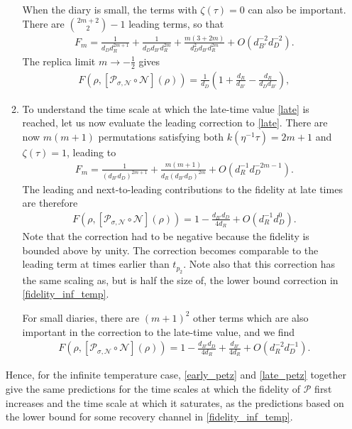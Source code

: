 \documentclass[a4paper,11pt]{article}
\newcommand\half{{\ensuremath{\frac{1}{2}}}}
\newcommand\ha{{\half}}
\newcommand\sP{{\ensuremath{{\mathcal P}}}}
\begin{document}
\begin{enumerate}
\begin{enumerate}
When the diary is small, the terms with $\zeta(\tau) = 0$ can also be important. There are $\binom{2m+2}{2}-1$ leading terms, so that 
\begin{align}
 F_m = \frac{1}{d_{D}d_R^{2m +1}} + \frac{1}{d_{D}d_{B'}d_R ^{2m }} + \frac{m(3+2m)}{d_{D}^2d_{B'}d_R ^{2m }} +O(d_{B'}^{-2}d_D^{-2}).
\end{align}
The replica limit $m \rightarrow -\ha$ gives
\begin{align}
 F(\rho , [\mathcal{P}_{\sigma,\mathcal{N}}\circ \mathcal{N}](\rho)) = \frac{1}{d_D}\left(1 + \frac{d_R}{ d_{B'}}- \frac{d_R}{d_{D}d_{B'}}\right),
\end{align}

\item 
To understand the time scale at which the late-time value \eqref{late} is reached, let us now evaluate the leading correction to \eqref{late}. There are now $m(m+1)$ permutations satisfying both $k(\eta^{-1} \tau) = 2m+1$ and $\zeta(\tau) = 1$, leading to
\begin{align}
 F_m = \frac{1}{(d_{B'}d_D)^{2m +1}} + \frac{ m(m+1) }{d_R ( d_{B'}d_D)^{2m }} + O\left(d_R^{-1}d_D^{-2m-1} \right).
\end{align}
The leading and next-to-leading contributions to the fidelity at late times are therefore
\begin{align}
 F(\rho, [\mathcal{P}_{\sigma,\mathcal{N}}\circ \mathcal{N}](\rho)) = 1 - \frac{d_{B'}d_D }{4d_R} + O\left(d_R^{-1} d_D^0 \right). \label{late_petz}
\end{align}
Note that the correction had to be negative because the fidelity is bounded above by unity. The correction becomes comparable to the leading term at times earlier than $t_{p_2}$. Note also that this correction has the same scaling as, but is half the size of, the lower bound correction in \eqref{fidelity_inf_temp}.

For small diaries, there are $(m+1)^2$ other terms which are also important in the correction to the late-time value, and we find 
\begin{align}
 F(\rho, [\mathcal{P}_{\sigma,\mathcal{N}}\circ \mathcal{N}](\rho)) = 1 - \frac{d_{B'}d_D }{4d_R} + \frac{d_{B'} }{4d_R} + O\left(d_R^{-2} d_D^{-1} \right).
\end{align}
\end{enumerate} 

Hence, for the infinite temperature case, \eqref{early_petz} and \eqref{late_petz} together give the same predictions for the time scales at which the fidelity of $\sP$ first increases and the time scale at which it saturates, as the predictions based on the lower bound for some recovery channel in \eqref{fidelity_inf_temp}. 


\end{enumerate}
\end{document}
